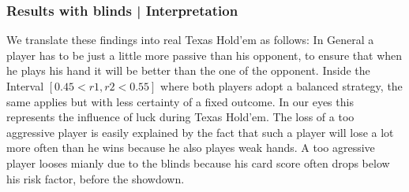 \documentclass[11pt]{article}
\begin{document}
\subsubsection{Results with blinds | Interpretation}

We translate these findings into real Texas Hold’em as follows: In General a player has to be just a little more passive than his opponent, to ensure that when he plays his hand it will be better than the one of the opponent.
Inside the Interval $[0.45 < r1,r2 < 0.55]$ where both players adopt a balanced strategy, the same applies but with less certainty of a fixed outcome. In our eyes this represents the influence of luck during Texas Hold’em. The loss of a too aggressive player is easily explained by the fact that such a player will lose a lot more often than he wins because he also playes weak hands. A too agressive player looses mianly due to the blinds because his card score often drops below his risk factor, before the showdown.
\end{document}
